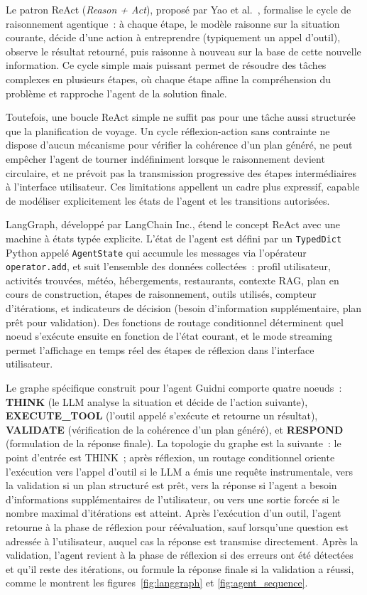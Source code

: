 Le patron ReAct (\textit{Reason + Act}), proposé par Yao et al.~\cite{yao2023react}, formalise
le cycle de raisonnement agentique~: à chaque étape, le modèle raisonne sur la situation courante,
décide d'une action à entreprendre (typiquement un appel d'outil), observe le résultat retourné,
puis raisonne à nouveau sur la base de cette nouvelle information. Ce cycle simple mais puissant
permet de résoudre des tâches complexes en plusieurs étapes, où chaque étape affine la
compréhension du problème et rapproche l'agent de la solution finale.

Toutefois, une boucle ReAct simple ne suffit pas pour une tâche aussi structurée que la
planification de voyage. Un cycle réflexion-action sans contrainte ne dispose d'aucun mécanisme
pour vérifier la cohérence d'un plan généré, ne peut empêcher l'agent de tourner indéfiniment
lorsque le raisonnement devient circulaire, et ne prévoit pas la transmission progressive des
étapes intermédiaires à l'interface utilisateur. Ces limitations appellent un cadre plus
expressif, capable de modéliser explicitement les états de l'agent et les transitions autorisées.

LangGraph, développé par LangChain Inc., étend le concept ReAct avec une machine à états typée
explicite. L'état de l'agent est défini par un \texttt{TypedDict} Python appelé \texttt{AgentState}
qui accumule les messages via l'opérateur \texttt{operator.add}, et suit l'ensemble des données
collectées~: profil utilisateur, activités trouvées, météo, hébergements, restaurants, contexte
RAG, plan en cours de construction, étapes de raisonnement, outils utilisés, compteur d'itérations,
et indicateurs de décision (besoin d'information supplémentaire, plan prêt pour validation). Des
fonctions de routage conditionnel déterminent quel noeud s'exécute ensuite en fonction de l'état
courant, et le mode streaming permet l'affichage en temps réel des étapes de réflexion dans
l'interface utilisateur.

Le graphe spécifique construit pour l'agent Guidni comporte quatre noeuds~: \textbf{THINK}
(le LLM analyse la situation et décide de l'action suivante), \textbf{EXECUTE\_TOOL} (l'outil
appelé s'exécute et retourne un résultat), \textbf{VALIDATE} (vérification de la cohérence
d'un plan généré), et \textbf{RESPOND} (formulation de la réponse finale). La topologie du
graphe est la suivante~: le point d'entrée est THINK~; après réflexion, un routage conditionnel
oriente l'exécution vers l'appel d'outil si le LLM a émis une requête instrumentale, vers la
validation si un plan structuré est prêt, vers la réponse si l'agent a besoin d'informations
supplémentaires de l'utilisateur, ou vers une sortie forcée si le nombre maximal d'itérations
est atteint. Après l'exécution d'un outil, l'agent retourne à la phase de réflexion pour
réévaluation, sauf lorsqu'une question est adressée à l'utilisateur, auquel cas la réponse est
transmise directement. Après la validation, l'agent revient à la phase de réflexion si des
erreurs ont été détectées et qu'il reste des itérations, ou formule la réponse finale si la
validation a réussi, comme le montrent les figures~\ref{fig:langgraph} et \ref{fig:agent_sequence}.

